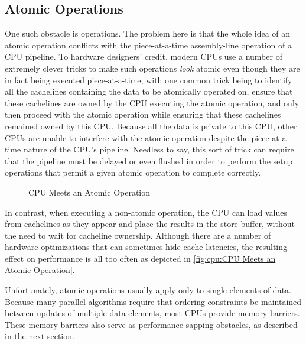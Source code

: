 \subsection{Atomic Operations}
\label{sec:cpu:Atomic Operations}

One such obstacle is  operations.
The problem here is that the whole idea of an atomic operation conflicts with
the piece-at-a-time assembly-line operation of a CPU pipeline.
To hardware designers' credit, modern CPUs use a number of extremely clever
tricks to make such operations \emph{look} atomic even though they
are in fact being executed piece-at-a-time,
with one common trick being to identify all the cachelines containing the
data to be atomically operated on,
ensure that these cachelines are owned by the CPU executing the
atomic operation, and only then proceed with the atomic operation
while ensuring that these cachelines remained owned by this CPU\@.
Because all the data is private to this CPU, other CPUs are unable to
interfere with the atomic operation despite the piece-at-a-time nature
of the CPU's pipeline.
Needless to say, this sort of trick can require that
the pipeline must be delayed or even flushed in order to
perform the setup operations that
permit a given atomic operation to complete correctly.

\begin{figure}
\centering
{}
\caption{CPU Meets an Atomic Operation}
\end{figure}

In contrast, when executing a non-atomic operation, the CPU can load
values from cachelines as they appear and place the results in the
store buffer, without the need to wait for cacheline ownership.
Although there are a number of hardware optimizations that can sometimes
hide cache latencies, the resulting effect on performance is all too
often as depicted in
\cref{fig:cpu:CPU Meets an Atomic Operation}.

Unfortunately, atomic operations usually apply only to single elements
of data.
Because many parallel algorithms require that ordering constraints
be maintained between updates of multiple data elements, most CPUs
provide memory barriers.
These memory barriers also serve as performance-sapping obstacles,
as described in the next section.

